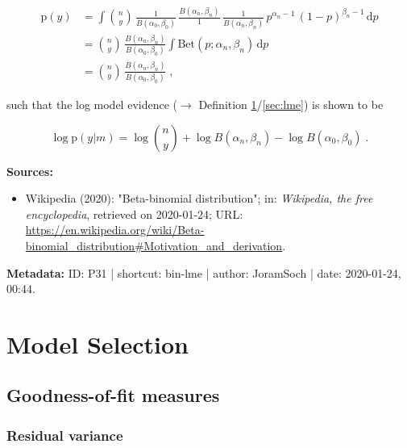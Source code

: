 \documentclass[a4paper,12pt]{book}
\begin{document}
\begin{equation} \label{eq:bin-lme-Bin-ME-qed}
\begin{split}
\mathrm{p}(y) &= \int {n \choose y} \, \frac{1}{B(\alpha_0,\beta_0)} \, \frac{B(\alpha_n,\beta_n)}{1} \, \frac{1}{B(\alpha_n,\beta_n)} \, p^{\alpha_n-1} \, (1-p)^{\beta_n-1} \, \mathrm{d}p \\
&= {n \choose y} \, \frac{B(\alpha_n,\beta_n)}{B(\alpha_0,\beta_0)} \int \mathrm{Bet}(p; \alpha_n, \beta_n) \, \mathrm{d}p \\
&= {n \choose y} \, \frac{B(\alpha_n,\beta_n)}{B(\alpha_0,\beta_0)} \; ,
\end{split}
\end{equation}

such that the log model evidence ($\rightarrow$ Definition \ref{sec:Model Selection}/\ref{sec:lme}) is shown to be

\begin{equation} \label{eq:bin-lme-Bin-LME-qed}
\log \mathrm{p}(y|m) = \log {n \choose y} + \log B(\alpha_n,\beta_n) - \log B(\alpha_0,\beta_0) \; .
\end{equation}

\vspace{1em}
\textbf{Sources:}
\begin{itemize}
\item Wikipedia (2020): "Beta-binomial distribution"; in: \textit{Wikipedia, the free encyclopedia}, retrieved on 2020-01-24; URL: \url{https://en.wikipedia.org/wiki/Beta-binomial_distribution#Motivation_and_derivation}.
\end{itemize}


\vspace{1em}
\textbf{Metadata:} ID: P31 | shortcut: bin-lme | author: JoramSoch | date: 2020-01-24, 00:44.




\chapter{Model Selection} \label{sec:Model Selection} \newpage

\pagebreak
\section{Goodness-of-fit measures}

\subsection{Residual variance}
\end{document}

